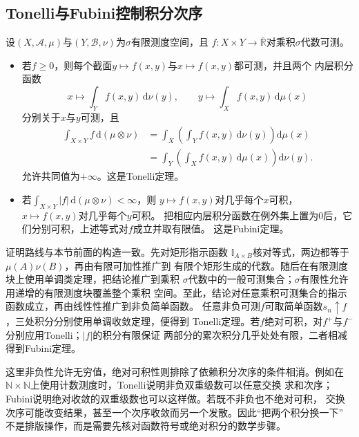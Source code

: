 \subsection{Tonelli与Fubini控制积分次序}
\begin{theorem}[Tonelli与Fubini定理]
\label{thm:analysis-tonelli-fubini}
设$(X,\mathcal{A},\mu)$与$(Y,\mathcal{B},\nu)$为$\sigma$有限测度空间，且 $f:X\times Y\to\overline{\mathbb{R}}$对乘积$\sigma$代数可测。
\begin{itemize}

\item 若$f\geq0$，则每个截面$y\mapsto f(x,y)$与$x\mapsto f(x,y)$都可测，并且两个
  内层积分函数
  \[
    x\longmapsto\int_Yf(x,y)\,\mathrm{d}\nu(y),
    \qquad
    y\longmapsto\int_Xf(x,y)\,\mathrm{d}\mu(x)
  \]
  分别关于$x$与$y$可测，且
  \[
    \begin{aligned}
      \int_{X\times Y}f\,\mathrm{d}(\mu\otimes\nu)
      &=
      \int_X\left(\int_Yf(x,y)\,\mathrm{d}\nu(y)\right)\mathrm{d}\mu(x)\\
      &=
      \int_Y\left(\int_Xf(x,y)\,\mathrm{d}\mu(x)\right)\mathrm{d}\nu(y).
    \end{aligned}
  \]
  允许共同值为$+\infty$。这是Tonelli定理。
\item 若$\int_{X\times Y}|f|\,\mathrm{d}(\mu\otimes\nu)<\infty$，则
  $y\mapsto f(x,y)$对几乎每个$x$可积，$x\mapsto f(x,y)$对几乎每个$y$可积。
  把相应内层积分函数在例外集上置为$0$后，它们分别可积，上述等式对$f$成立并取有限值。
  这是Fubini定理。
\end{itemize}
\end{theorem}

证明路线与本节前面的构造一致。先对矩形指示函数
$\mathbb{I}_{A\times B}$核对等式，两边都等于$\mu(A)\nu(B)$，再由有限可加性推广到
有限个矩形生成的代数。随后在有限测度块上使用单调类定理，把结论推广到乘积
$\sigma$代数中的一般可测集合；$\sigma$有限性允许用递增的有限测度块覆盖整个乘积
空间。至此，结论对任意乘积可测集合的指示函数成立，再由线性性推广到非负简单函数。
任意非负可测$f$可取简单函数$s_n\uparrow f$，三处积分分别使用单调收敛定理，便得到
Tonelli定理。若$f$绝对可积，对$f^+$与$f^-$分别应用Tonelli；$|f|$的积分有限保证
两部分的累次积分几乎处处有限，二者相减得到Fubini定理。

这里非负性允许无穷值，绝对可积性则排除了依赖积分次序的条件相消。例如在
$\mathbb{N}\times\mathbb{N}$上使用计数测度时，Tonelli说明非负双重级数可以任意交换
求和次序；Fubini说明绝对收敛的双重级数也可以这样做。若既不非负也不绝对可积，
交换次序可能改变结果，甚至一个次序收敛而另一个发散。因此“把两个积分换一下”
不是排版操作，而是需要先核对函数符号或绝对积分的数学步骤。
